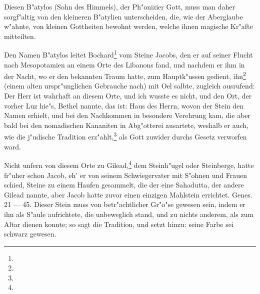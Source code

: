 \documentclass[a4paper, 11pt, oneside, polutonikogreek, german]{article}
\begin{document}
Diesen B"atylos (Sohn des Himmels), der Ph"onizier Gott, muss man daher sorgf"altig von den kleineren B"atylien unterscheiden, die, wie der Aberglaube w"ahnte, von kleinen Gottheiten bewohnt werden, welche ihnen magische Kr"afte mitteilten.

Den Namen B"atylos leitet Bochard\footnote{} vom Steine Jacobs, den er auf seiner Flucht nach Mesopotamien an einem Orte des Libanons fand, und nachdem er ihm in der Nacht, wo er den bekannten Traum hatte, zum Hauptk"ussen gedient, ihn\footnote{} (einem alten urspr"unglichen Gebrauche nach) mit Oel salbte, zugleich ausrufend: Der Herr ist wahrhaft an diesem Orte, und ich wusste es nicht, und den Ort, der vorher Luz hie"s, Bethel nannte, das ist: Haus des Herrn, wovon der Stein den Namen erhielt, und bei den Nachkommen in besondere Verehrung kam, die aber bald bei den nomadischen Kananiten in Abg"otterei ausartete, weshalb er auch, wie die j"udische Tradition erz"ahlt,\footnote{} als Gott zuwider durchs Gesetz verworfen ward.

Nicht unfern von diesem Orte zu Gilead,\footnote{} dem Steinh"ugel oder Steinberge, hatte fr"uher schon Jacob, eh' er von seinem Schwiegervater mit S"ohnen und Frauen schied, Steine zu einem Haufen gesammelt, die der eine Sahadutta, der andere Gilead nannte, aber Jacob hatte zuvor einen einzigen Mahlstein errichtet. Genes. 21 --- 45. Dieser Stein muss von betr"achtlicher Gr"o"se gewesen sein, indem er ihn als S"aule aufrichtete, die unbeweglich stand, und zu nichts anderem, als zum Altar dienen konnte; so sagt die Tradition, und setzt hinzu: seine Farbe sei schwarz gewesen.
\end{document}

